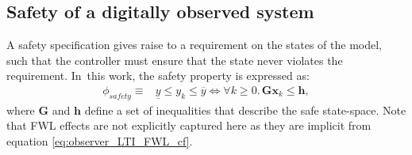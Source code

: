 \documentclass[sigconf]{llncs}
\newcommand{\mat}[1]{\boldsymbol{#1}}
\renewcommand{\vec}[1]{\boldsymbol{#1}}
\begin{document}

\subsection{Safety of a digitally observed system}\label{sec:cof_safety}
A safety specification gives raise to a requirement on the
states of the model, such that the controller
must ensure that the state never violates the
requirement.
In~this work, the safety property is expressed as:
%
\begin{align}
  \phi_\mathit{safety}\equiv& \underline{y} \leq y_k \leq \overline{y}
\iff \forall k\geq 0.\, \mat{G}\vec{x}_k \leq \vec{h},
\label{eq:safetyspec}
\end{align}
%
where $\mat{G}$ and $\vec{h}$ define a set of inequalities that describe the safe state-space.
%
Note that FWL effects are not explicitly captured here
as they are implicit from equation \ref{eq:observer_LTI_FWL_cf}.
%
%
%
\end{document}
